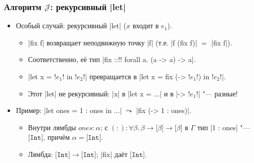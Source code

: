 \documentclass[11pt]{beamer}
\newcommand{\lst}[1]{\mathtt{[}#1\mathtt{]}}
\newcommand{\tInt}{\mathtt{Int}}
\newcommand{\J}{\mathcal{J}}
\begin{document}
\begin{frame}[fragile]
  \frametitle{Алгоритм $\J$: рекурсивный \haskinline|let|}
  \begin{itemize}
    \item Особый случай: рекурсивный \haskinline|let| ($x$ входит в $e_1$). \pause
          \begin{itemize}
            \item \haskinline|fix f| возвращает неподвижную точку \haskinline|f| (т.е. \haskinline|f (fix f)| $=$ \haskinline|fix f|). \pause
            \item Соответственно, её тип \haskinline|fix ::!\pause! forall a. (a -> a) -> a|. \pause
            \item \haskinline|let x = !$e_1$! in !$e_2$!| превращается в \haskinline|let x = fix (\x -> !$e_1$!) in !$e_2$!|.
            \item Этот \haskinline|let| не рекурсивный: \pause \haskinline|x| в \haskinline|let x = ...| и в \haskinline|\x -> !$e_1$!| "--- разные!
          \end{itemize}
          \pause
    \item Пример: \haskinline|let ones = 1 : ones in ...| $\leadsto$ \pause \haskinline|fix (\ones -> 1 : ones)|.
          \begin{itemize}
            \item Внутри лямбды $\mathit{ones} : \alpha$; с $(:) : \forall\beta.\,\beta \to \lst{\beta} \to \lst{\beta}$ в $\Gamma$ тип \haskinline|1 : ones| \pause "--- $\lst{\tInt}$, причём $\alpha = \lst{\tInt}$.
                  \pause
            \item Лямбда: $\lst{\tInt} \to \lst{\tInt}$; \haskinline|fix| даёт $\lst{\tInt}$.
          \end{itemize}
  \end{itemize}
\end{frame}
\end{document}
